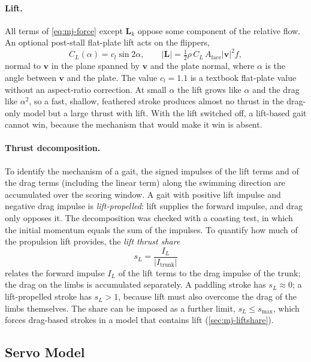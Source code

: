 \paragraph{Lift.} All terms of \eqref{eq:mj-force} except $\bm L_k$ oppose some component of the relative flow.
An optional post-stall flat-plate lift acts on the flippers,
\begin{equation}
  C_L(\alpha) = c_l \sin 2\alpha, \qquad |\bm L| = \tfrac12\rho\,C_L\,A_\text{face}|\bm v|^2 f,
  \label{eq:mj-lift}
\end{equation}
normal to $\bm v$ in the plane spanned by $\bm v$ and the plate normal, where $\alpha$ is the angle between
$\bm v$ and the plate. The value $c_l=1.1$ is a textbook flat-plate value without an aspect-ratio correction.
At small $\alpha$ the lift grows like $\alpha$ and the drag like $\alpha^2$, so a fast, shallow, feathered
stroke produces almost no thrust in the drag-only model but a large thrust with lift. With the lift switched
off, a lift-based gait cannot win, because the mechanism that would make it win is absent.

\paragraph{Thrust decomposition.} To identify the mechanism of a gait, the signed impulses of the lift terms and
of the drag terms (including the linear term) along the swimming direction are accumulated over the scoring
window. A gait with positive lift impulse and negative drag impulse is \emph{lift-propelled}: lift supplies the
forward impulse, and drag only opposes it. The decomposition was checked with a coasting test, in which the
initial momentum equals the sum of the impulses. To quantify how much of the propulsion lift provides, the
\emph{lift thrust share}
\begin{equation}
  s_L = \frac{I_L}{|I_\text{trunk}|}
  \label{eq:liftshare}
\end{equation}
relates the forward impulse $I_L$ of the lift terms to the drag impulse of the trunk; the drag on the limbs is
accumulated separately. A paddling stroke has $s_L\approx0$; a lift-propelled stroke has $s_L>1$, because lift must also
overcome the drag of the limbs themselves. The share can be imposed as a further limit, $s_L\le s_\text{max}$, which forces
drag-based strokes in a model that contains lift (\cref{sec:mj-liftshare}).

\subsection{Servo Model}
\label{sec:mj-servo}

